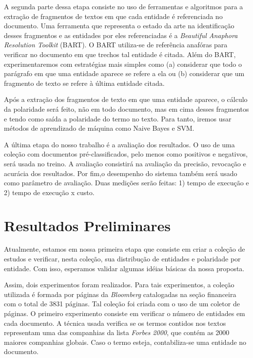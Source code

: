 \documentclass[a4paper,12pt]{article}
\begin{document}
A segunda parte dessa etapa consiste no uso de ferramentas e algoritmos para a extração de fragmentos de textos em que cada entidade é referenciada no documento. Uma ferramenta que representa o estado da arte na identificação desses fragmentos e as entidades por eles referenciadas é a \textit{Beautiful Anaphora Resolution Toolkit} (BART). O BART utiliza-se de referência anafóras para verificar no documento em que trechos tal entidade é citada. Além do BART, experimentaremos com estratégias mais simples como (a) considerar que todo o parágrafo em que uma entidade aparece se refere a ela ou (b) considerar que um fragmento de texto se refere à última entidade citada.

Após a extração dos fragmentos de texto em que uma entidade aparece, o cálculo da polaridade será feito, não em todo documento, mas em cima desses fragmentos e tendo como saída a polaridade do termo no texto. Para tanto, iremos usar métodos de aprendizado de máquina como Naive Bayes e SVM.

A última etapa do nosso trabalho é a avaliação dos resultados. O uso de uma coleção com documentos pré-classificados, pelo menos como positivos e negativos, será usada no treino. A avaliação consistirá na avaliação da precisão, revocação e acurácia dos resultados. Por fim,o desempenho do sistema também será usado como parâmetro de avaliação. Duas medições serão feitas: 1) tempo de execução e 2) tempo de execução x custo.

\section{Resultados Preliminares}

Atualmente, estamos em nossa primeira etapa que consiste em criar a coleção de estudos e verificar, nesta coleção, sua distribução de entidades e polaridade por entidade. Com isso, esperamos validar algumas idéias básicas da nossa proposta.

Assim, dois experimentos foram realizados. Para tais experimentos, a coleção utilizada é formada por páginas da \textit{Bloomberg} catalogadas na seção financeira com o total de 3831 páginas. Tal coleção foi criada com o uso de um coletor de páginas. O primeiro experimento consiste em verificar o número de entidades em cada documento. A técnica usada verifica se os termos contidos nos textos representam uma das companhias da lista \textit{Forbes 2000}, que contém as 2000 maiores companhias globais. Caso o termo esteja, contabiliza-se uma entidade no documento. 
\end{document}
